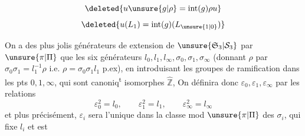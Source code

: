 \[
\deleted{\displaystyle u\unsure{g|\rho}=\operatorname{int}(g)\rho u}
\]
\[
\deleted{\displaystyle u(L_1)=\operatorname{int}(g)(L_{\unsure{1|0}})}
\]

On a des plus jolis générateurs de  extension de $\unsure{\mathfrak S_3|\mathcal S_3}$ par $\unsure{\pi|\Pi}$  que les six générateurs $l_0,l_1,l_\infty,\sigma_0,\sigma_1,\sigma_\infty$ (donnant $\rho$ par $\sigma_0\sigma_1=l_1^{-1}\rho$  i.e. $\rho=\sigma_0\sigma_1l_1$ p.ex), en introduisant les groupes de ramification dans les pts $0,1,\infty$, qui sont canoniq\textsuperscript{t} isomorphes  $\widehat{\mathbb Z}$,
On définira donc $\varepsilon_0,\varepsilon_1,\varepsilon_\infty$ par les relations
\[
\varepsilon_0^2=l_0,\qquad\varepsilon_1^2=l_1,\qquad\varepsilon_\infty^2=l_\infty
\]
et plus précisément, $\varepsilon_i$ sera l'unique   dans la classe mod $\unsure{\pi|\Pi}$ des $\sigma_i$,  qui fixe $l_i$ et est  

